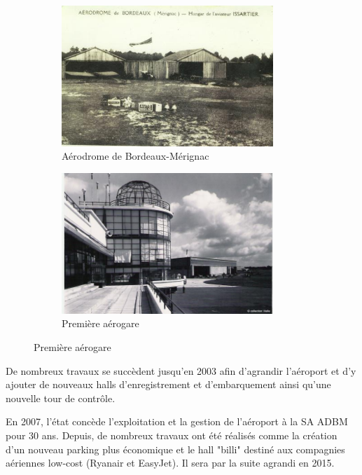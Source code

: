 \begin{figure}[hbt!]
    \begin{subfigure}{0.5\textwidth}
      \centering
      \includegraphics[width=8cm]{Images/premier.jpg}  
      \caption{Aérodrome de Bordeaux-Mérignac}
      \label{fig:aérodrome}
    \end{subfigure}
    \begin{subfigure}{0.5\textwidth}
      \centering
      \includegraphics[width=8cm]{Images/premiere_aerogare.jpg}  
      \caption{Première aérogare}
      \label{fig:premiereAerogare}
    \end{subfigure}
\end{figure}


\newpage
De nombreux travaux se succèdent jusqu'en 2003 afin d'agrandir l'aéroport et d'y ajouter de nouveaux halls d'enregistrement et d'embarquement ainsi qu'une nouvelle tour de contrôle.

En 2007, l'état concède l'exploitation et la gestion de l'aéroport à la SA ADBM pour 30 ans. Depuis, de nombreux travaux ont été réalisés comme la création d'un nouveau parking plus économique et le hall "billi" destiné aux compagnies aériennes low-cost (Ryanair et EasyJet). Il sera par la suite agrandi en 2015.\newline

